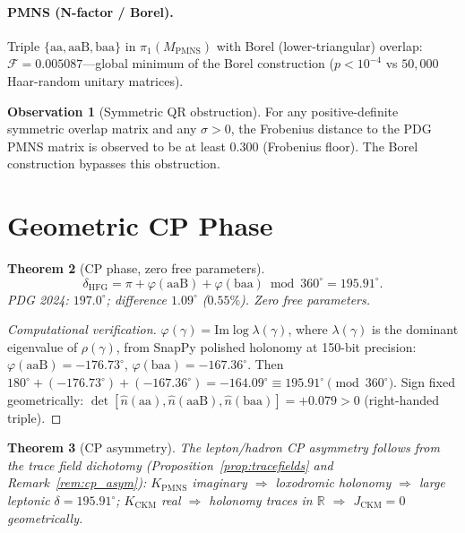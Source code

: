 \documentclass[11pt,a4paper]{article}
\newtheorem{theorem}{Theorem}
\theoremstyle{definition}
\newtheorem{observation}[theorem]{Observation}
\theoremstyle{remark}
\newcommand{\MPMNS}{M_{\mathrm{PMNS}}}
\newcommand{\KPMNS}{K_{\mathrm{PMNS}}}
\newcommand{\KCKM}{K_{\mathrm{CKM}}}
\begin{document}
\paragraph{PMNS (N-factor / Borel).}
Triple $\{\mathrm{aa},\mathrm{aaB},\mathrm{baa}\}$
in $\pi_1(\MPMNS)$ with Borel (lower-triangular) overlap:
$\mathcal{F}=0.005087$---global minimum of the Borel construction
($p<10^{-4}$ vs $50{,}000$ Haar-random unitary matrices).

\begin{observation}[Symmetric QR obstruction]
For any positive-definite symmetric overlap matrix and any $\sigma>0$,
the Frobenius distance to the PDG PMNS matrix is observed to be
at least $0.300$ (Frobenius floor).
The Borel construction bypasses this obstruction.
\end{observation}

\section{Geometric CP Phase}
\label{sec:cp}

\begin{theorem}[CP phase, zero free parameters]
\label{thm:cp}
\[
  \delta_{\mathrm{HFG}}
  = \pi + \varphi(\mathrm{aaB}) + \varphi(\mathrm{baa})
  \bmod 360^\circ
  = 195.91^\circ.
\]
PDG 2024: $197.0^\circ$; difference $1.09^\circ$ ($0.55\%$).
Zero free parameters.
\end{theorem}

\begin{proof}[Computational verification]
$\varphi(\gamma)=\mathrm{Im}\log\lambda(\gamma)$,
where $\lambda(\gamma)$ is the dominant eigenvalue of
$\rho(\gamma)$, from SnapPy polished holonomy at 150-bit precision:
$\varphi(\mathrm{aaB})=-176.73^\circ$,
$\varphi(\mathrm{baa})=-167.36^\circ$.
Then $180^\circ+(-176.73^\circ)+(-167.36^\circ)
= -164.09^\circ\equiv195.91^\circ\pmod{360^\circ}$.
Sign fixed geometrically:
$\det[\hat{n}(\mathrm{aa}),\hat{n}(\mathrm{aaB}),
\hat{n}(\mathrm{baa})]=+0.079>0$ (right-handed triple).
\end{proof}

\begin{theorem}[CP asymmetry]
\label{thm:cp_asym}
The lepton/hadron CP asymmetry follows from the trace field
dichotomy (Proposition~\ref{prop:tracefields}
and Remark~\ref{rem:cp_asym}):
$\KPMNS$ imaginary $\Rightarrow$ loxodromic holonomy $\Rightarrow$
large leptonic $\delta=195.91^\circ$;
$\KCKM$ real $\Rightarrow$ holonomy traces in $\mathbb{R}$
$\Rightarrow$ $J_\mathrm{CKM}=0$ geometrically.
\end{theorem}
\end{document}
